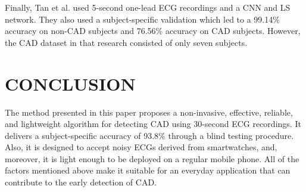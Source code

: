 Finally, Tan et al. \cite{tan} used 5-second one-lead ECG recordings and a CNN and LS network. They also used a subject-specific validation which led to a 99.14\% accuracy on non-CAD subjects and 76.56\% accuracy on CAD subjects. However, the CAD dataset in that research consisted of only seven subjects.
%
\section{CONCLUSION}
\label{sec:conclusion}
The method presented in this paper proposes a non-invasive, effective, reliable, and lightweight algorithm for detecting CAD using 30-second ECG recordings. It delivers a subject-specific accuracy of 93.8\% through a blind testing procedure. Also, it is designed to accept noisy ECGs derived from smartwatches, and, moreover, it is light enough to be deployed on a regular mobile phone. All of the factors mentioned above make it suitable for an everyday application that can contribute to the early detection of CAD.
%
%




